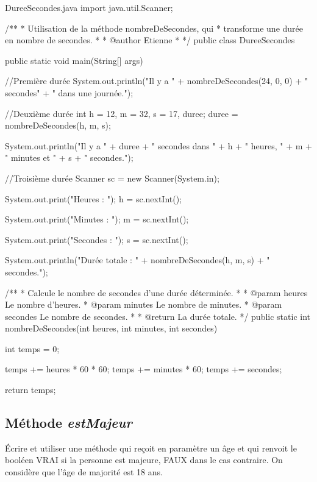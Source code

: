 \documentclass[12pt]{article}
\begin{document}
\begin{MyTCB}{DureeSecondes.java}
import java.util.Scanner;

/**
 * Utilisation de la méthode nombreDeSecondes, qui
 * transforme une durée en nombre de secondes.
 *
 * @author Etienne
 *
 */
public class DureeSecondes {

	
	public static void main(String[] args) {

		
		//Première durée
		System.out.println("Il y a " + nombreDeSecondes(24, 0, 0) + " secondes"
				+ " dans une journée.");
		
		
		//Deuxième durée
		int h = 12, m = 32, s = 17, duree;
		duree = nombreDeSecondes(h, m, s);
		
		System.out.println("Il y a " + duree + " secondes dans " 
				+ h + " heures, " + m + " minutes et " + s + " secondes.");

		
		//Troisième durée
		Scanner sc = new Scanner(System.in);
		
		System.out.print("Heures : ");
		h = sc.nextInt();
		
		System.out.print("Minutes : ");
		m = sc.nextInt();
		
		System.out.print("Secondes : ");
		s = sc.nextInt();
		
		System.out.println("Durée totale : " + nombreDeSecondes(h, m, s) + " secondes.");
		
	}
	
	
	/**
	 * Calcule le nombre de secondes d'une durée déterminée.
	 * 
	 * @param heures Le nombre d'heures.
	 * @param minutes Le nombre de minutes.
	 * @param secondes Le nombre de secondes.
	 * 
	 * @return La durée totale.
	 */
	public static int nombreDeSecondes(int heures, int minutes, int secondes) {
		
		int temps = 0;
		
		temps += heures * 60 * 60;
		temps += minutes * 60;
		temps += secondes;
		
		return temps;
		
	}

}
\end{MyTCB}
\subsection{Méthode \emph{estMajeur}}

Écrire et utiliser une méthode qui reçoit en paramètre un âge et qui renvoit le booléen VRAI si la personne est majeure, FAUX dans le cas contraire. On considère que l'âge de majorité est 18 ans.
\end{document}
